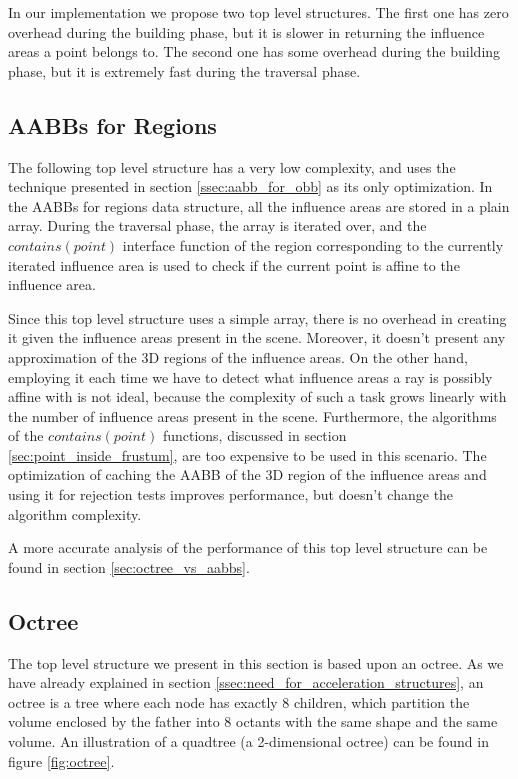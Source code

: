 \documentclass{PoliMi_MasterThesis}
\begin{document}
In our implementation we propose two top level structures. The first one has zero overhead during the building phase, but it is slower in returning the influence areas a point belongs to. The second one has some overhead during the building phase, but it is extremely fast during the traversal phase.

\subsection{AABBs for Regions} \label{ssec:top_level_aabbs}
The following top level structure has a very low complexity, and uses the technique presented in section \ref{ssec:aabb_for_obb} as its only optimization.
In the AABBs for regions data structure, all the influence areas are stored in a plain array. During the traversal phase, the array is iterated over, and the $contains(point)$ interface function of the region corresponding to the currently iterated influence area is used to check if the current point is affine to the influence area.

Since this top level structure uses a simple array, there is no overhead in creating it given the influence areas present in the scene. Moreover, it doesn't present any approximation of the 3D regions of the influence areas. On the other hand, employing it each time we have to detect what influence areas a ray is possibly affine with is not ideal, because the complexity of such a task grows linearly with the number of influence areas present in the scene. Furthermore, the algorithms of the $contains(point)$ functions, discussed in section \ref{sec:point_inside_frustum}, are too expensive to be used in this scenario. The optimization of caching the AABB of the 3D region of the influence areas and using it for rejection tests improves performance, but doesn't change the algorithm complexity.

A more accurate analysis of the performance of this top level structure can be found in section \ref{sec:octree_vs_aabbs}.

\subsection{Octree} \label{ssec:top_level_octree}
The top level structure we present in this section is based upon an octree. As we have already explained in section \ref{ssec:need_for_acceleration_structures}, an octree is a tree where each node has exactly 8 children, which partition the volume enclosed by the father into 8 octants with the same shape and the same volume. An illustration of a quadtree (a 2-dimensional octree) can be found in figure \ref{fig:octree}.
\end{document}
